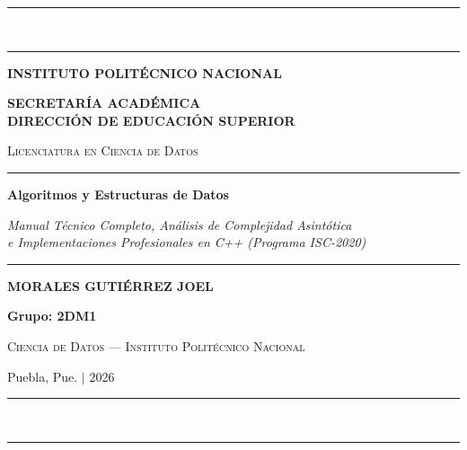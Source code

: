 \documentclass[11pt,letterpaper]{article}
\begin{document}
\begin{titlepage}
\centering
\vspace*{0.8cm}
\textcolor{ipnguinda}{\rule{\linewidth}{4pt}}\\[3pt]
\textcolor{ipnblue}{\rule{\linewidth}{1pt}}

\vspace{1.5cm}
{\huge\bfseries\color{ipnguinda} INSTITUTO POLIT\'ECNICO NACIONAL\par}
\vspace{0.35cm}
{\large\bfseries\color{ipnblue} SECRETAR\'IA ACAD\'EMICA \\ DIRECCI\'ON DE EDUCACI\'ON SUPERIOR\par}
\vspace{0.5cm}
{\Large\scshape\color{textdark} Licenciatura en Ciencia de Datos\par}

\vspace{1.2cm}
\textcolor{ipnguinda}{\rule{0.78\linewidth}{1.5pt}}
\vspace{0.9cm}

{\Huge\bfseries\color{textdark} Algoritmos y Estructuras de Datos\par}
\vspace{0.45cm}
{\large\itshape\color{ipnblue} Manual T\'ecnico Completo, An\'alisis de Complejidad Asint\'otica \\ e Implementaciones Profesionales en C++ (Programa ISC-2020)\par}

\vspace{0.9cm}
\textcolor{ipnguinda}{\rule{0.78\linewidth}{1.5pt}}

\vspace{2.2cm}
{\Large\bfseries\color{textdark} MORALES GUTI\'ERREZ JOEL\par}
\vspace{0.35cm}
{\large\bfseries\color{ipnblue} Grupo: 2DM1\par}

\vfill
{\normalsize\scshape\color{ipnguinda} Ciencia de Datos --- Instituto Polit\'ecnico Nacional\par}
\vspace{0.2cm}
{\small\color{gray} Puebla, Pue. $\mid$ 2026\par}
\vspace{0.8cm}
\textcolor{ipnblue}{\rule{\linewidth}{1pt}}\\[3pt]
\textcolor{ipnguinda}{\rule{\linewidth}{4pt}}
\end{titlepage}
\end{document}
